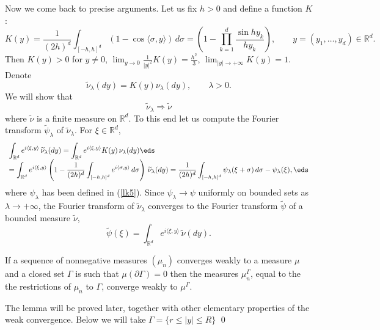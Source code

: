 \documentclass[preprint]{imsart}
\def\R{\mathbb R}
\def\ds{\displaystyle}
\begin{document}
{Now we come back to precise arguments.
 Let us fix $h>0$ and define a function $K$:
$$
K(y)= \frac{1}{(2h)^d}\int_{[-h,h]^d}
\left( 1-\cos \langle \sigma ,y\rangle\right)\,
d\sigma =
\left(1-\prod_{k=1}^d\frac{\sin hy_k}{hy_k}\right),
\qquad y=(y_1,\ldots ,y_d)\in\R^d.
$$
Then $K(y)>0$ for $y\neq 0$, $\lim_{y\to 0}
\frac{1}{|y|^2}K(y)=\frac{h^2}{3}$,
$\lim_{|y|\to +\infty} K(y)=1$. Denote
$$
\widetilde{\nu}_\lambda(dy)
= K(y)\nu_\lambda(dy), \qquad \lambda >0.
$$
We will show that
$$\widetilde{\nu}_\lambda
\Rightarrow
\widetilde{\nu}
$$
where $\widetilde{\nu}$
is a finite measure on $\R^d$. To this end let us
compute the Fourier transform $\widetilde{\psi}_{\lambda}$ of
$\widetilde{\nu}_\lambda$. For $\xi\in\R^d$,
$$
  \begin{array}{l}
    \ds
    \int_{\R^d}e^{i\langle \xi,y\rangle} \,
    \widetilde{\nu}_\lambda(dy)
    =
\int_{\R^d}e^{i\langle \xi,y\rangle}K(y)\,
\nu_\lambda(dy)
\eds
     \\
    \ds
= \int_{\R^d}e^{i\langle \xi,y\rangle}
\left(1-\frac{1}{(2h)^d}\int_{[-h,h]^d}
e^{i \langle \sigma,y\rangle} \, d\sigma\right)
\,\widetilde{\nu}_\lambda (dy)
=
\frac{1}{(2h)^d}\int_{[-h,h]^d}
\psi_\lambda (\xi+\sigma)\, d\sigma - \psi_\lambda (\xi),
\eds  \end{array}
$$
where $\psi_\lambda $ has been defined in (\ref{lk5}).
Since $\psi_\lambda\to\psi$ uniformly on bounded sets
as $\lambda\to +\infty$, the Fourier transform of
$\widetilde{\nu}_\lambda$ converges to the Fourier
transform $\widetilde{\psi}$ of a bounded measure $\widetilde{\nu}$,
$$
\widetilde{\psi}(\xi) =
\int_{\R^d}e^{i\langle \xi,y\rangle}
\,\widetilde{\nu}(dy).
$$

\begin{Lemma}
If a sequence of nonnegative measures $(\mu_n)$
converges weakly to a measure $\mu$ and a closed
set $\Gamma$ is such that $\mu(\partial
\Gamma)=0$ then the measures $\mu_n^\Gamma$, equal to
the the restrictions of  $\mu_n$ to $\Gamma$,  converge
weakly to $\mu^\Gamma$.
\end{Lemma}

The lemma will be proved later, together with other
elementary properties of the weak convergence. Below we will take
$\Gamma=\{ r\leq |y| \leq R\}$ \qed

}
\end{document}
